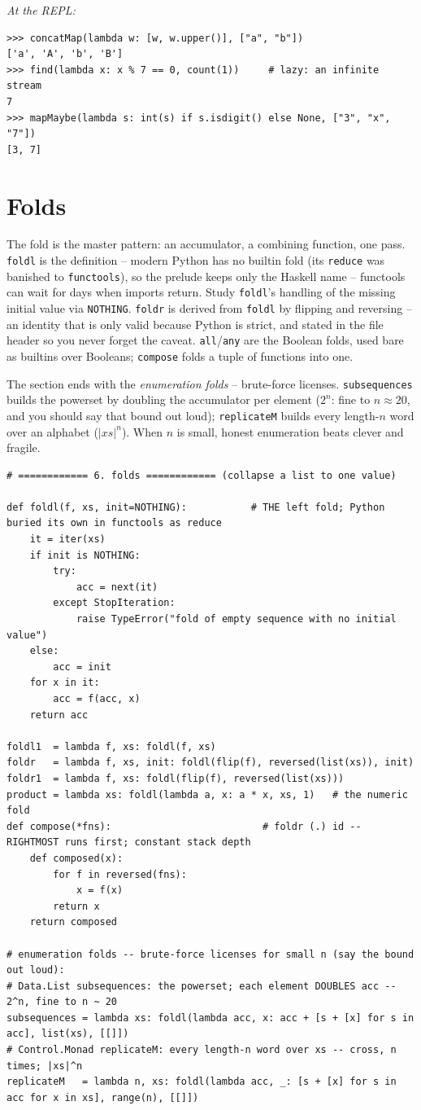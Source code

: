 \documentclass[11pt,letterpaper]{book}
\begin{document}
\noindent\textit{At the REPL:}
\begin{lstlisting}[style=spec]
>>> concatMap(lambda w: [w, w.upper()], ["a", "b"])
['a', 'A', 'b', 'B']
>>> find(lambda x: x % 7 == 0, count(1))     # lazy: an infinite stream
7
>>> mapMaybe(lambda s: int(s) if s.isdigit() else None, ["3", "x", "7"])
[3, 7]
\end{lstlisting}
\chapter{Folds}

The fold is the master pattern: an accumulator, a combining function, one pass.
\texttt{foldl} is the definition -- modern Python has no builtin fold (its
\texttt{reduce} was banished to \texttt{functools}), so the prelude keeps only
the Haskell name -- functools can wait for days when imports return. Study
\texttt{foldl}'s handling of the missing initial value via
\texttt{NOTHING}. \texttt{foldr} is derived from
\texttt{foldl} by flipping and reversing -- an identity that is only valid
because Python is strict, and stated in the file header so you never forget the
caveat. \texttt{all}/\texttt{any} are the Boolean folds, used bare as builtins
over Booleans; \texttt{compose} folds a tuple of functions into one.

The section ends with the \emph{enumeration folds} -- brute-force licenses.
\texttt{subsequences} builds the powerset by doubling the accumulator per
element ($2^n$: fine to $n \approx 20$, and you should say that bound out
loud); \texttt{replicateM} builds every length-$n$ word over an alphabet
($|xs|^n$). When $n$ is small, honest enumeration beats clever and fragile.
\begin{lstlisting}[style=code]
# ============ 6. folds ============ (collapse a list to one value)

def foldl(f, xs, init=NOTHING):           # THE left fold; Python buried its own in functools as reduce
    it = iter(xs)
    if init is NOTHING:
        try:
            acc = next(it)
        except StopIteration:
            raise TypeError("fold of empty sequence with no initial value")
    else:
        acc = init
    for x in it:
        acc = f(acc, x)
    return acc

foldl1  = lambda f, xs: foldl(f, xs)
foldr   = lambda f, xs, init: foldl(flip(f), reversed(list(xs)), init)
foldr1  = lambda f, xs: foldl(flip(f), reversed(list(xs)))
product = lambda xs: foldl(lambda a, x: a * x, xs, 1)   # the numeric fold
def compose(*fns):                          # foldr (.) id -- RIGHTMOST runs first; constant stack depth
    def composed(x):
        for f in reversed(fns):
            x = f(x)
        return x
    return composed

# enumeration folds -- brute-force licenses for small n (say the bound out loud):
# Data.List subsequences: the powerset; each element DOUBLES acc -- 2^n, fine to n ~ 20
subsequences = lambda xs: foldl(lambda acc, x: acc + [s + [x] for s in acc], list(xs), [[]])
# Control.Monad replicateM: every length-n word over xs -- cross, n times; |xs|^n
replicateM   = lambda n, xs: foldl(lambda acc, _: [s + [x] for s in acc for x in xs], range(n), [[]])
\end{lstlisting}
\end{document}
